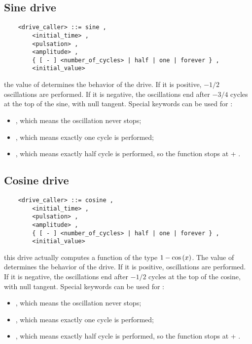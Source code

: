 \subsection{Sine drive}
\begin{verbatim}
    <drive_caller> ::= sine ,
        <initial_time> ,
        <pulsation> ,
        <amplitude> ,
        { [ - ] <number_of_cycles> | half | one | forever } , 
        <initial_value>
\end{verbatim}
the value of  determines the behavior of the
drive. 
If it is positive, $-1/2$ oscillations are
performed. 
If it is negative, the oscillations end after 
$-3/4$ cycles at the top of the sine, with null
tangent.
Special keywords can be used for :
\begin{itemize}
	\item {}, which means the oscillation never stops;
	\item {}, which means exactly one cycle is performed;
	\item {}, which means exactly half cycle is performed,
	so the function stops at  + .
\end{itemize}

\subsection{Cosine drive}
\begin{verbatim}
    <drive_caller> ::= cosine ,
        <initial_time> ,
        <pulsation> ,
        <amplitude> ,
        { [ - ] <number_of_cycles> | half | one | forever } , 
        <initial_value>
\end{verbatim}
this drive actually computes a function of the type $ 1-\mathrm{cos}\left( x \right) $.
The value of  determines the behavior of the
drive. 
If it is positive,  oscillations are
performed.
If it is negative, the oscillations end after
$-1/2$ cycles at the top of the cosine, with null
tangent.   
Special keywords can be used for :
\begin{itemize}
	\item {}, which means the oscillation never stops;
	\item {}, which means exactly one cycle is performed;
	\item {}, which means exactly half cycle is performed,
	so the function stops at  + .
\end{itemize}

